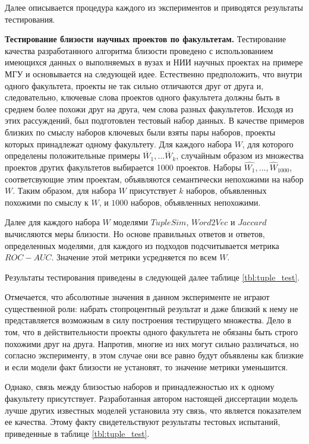 Далее описывается процедура каждого из экспериментов и приводятся результаты тестирования. 

\textbf{Тестирование близости научных проектов по факультетам.} Тестирование качества разработанного алгоритма близости проведено с использованием имеющихся данных о выполняемых в вузах и НИИ научных проектах на примере МГУ и основывается на следующей идее.
Естественно предположить, что  внутри одного факультета, проекты не так сильно отличаются друг от друга и, следовательно, ключевые слова проектов одного факультета должны быть в среднем более похожи друг на друга, чем слова разных факультетов. Исходя из этих рассуждений, был подготовлен тестовый набор данных. В качестве примеров близких по смыслу наборов ключевых были взяты пары наборов, проекты которых принадлежат одному факультету. Для каждого набора $W$, для которого определены положительные примеры $\overline{W}_{1}, ... \overline{W}_{k}$, случайным образом из множества проектов других факультетов выбирается 1000 проектов. Наборы $\hat{W_1}, ..., \hat{W}_{1000}$, соответсвующие этим проектам, объявляются семантически непохожими на набор $W$. Таким образом, для набора $W$ присутствует $k$ наборов, объявленных похожими по смыслу к $W$, и $1000$ наборов, объявленных непохожими.

Далее для каждого набора $W$ моделями $TupleSim$, $Word2Vec$ и  $Jaccard$ вычисляются меры близости. Но основе правильных ответов и ответов, определенных моделями, для каждого из подходов подсчитывается метрика $ROC-AUC$. Значение этой метрики усредняется по всем $W$.

Результаты тестирования приведены в следующей далее таблице \ref{tbl:tuple_test}.

Отмечается, что абсолютные значения в данном эксперименте не играют существенной роли: набрать стопроцентный результат и даже близкий к нему не представляется возможным в силу построения тестирущего множества. Дело в том, что в действительности проекты одного факультета не обязаны быть строго похожими друг на друга. Напротив, многие из них могут сильно различаться, но согласно эксперименту, в этом случае они все равно будут объявлены как близкие и если модели факт близости не установят, то значение метрики уменьшится. 

Однако, связь между близостью наборов и принадлежностью их к одному факультету присутствует. Разработанная автором настоящей диссертации модель лучше других известных моделей установила эту связь, что является показателем ее качества. Этому факту свидетельствуют результаты тестовых испытаний, приведенные в таблице \ref{tbl:tuple_test}.

